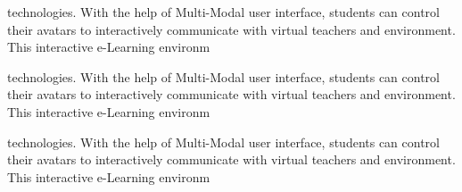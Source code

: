 \documentclass{article}
\begin{document}
technologies. With the help of Multi-Modal user interface, students can control their avatars to interactively communicate with virtual teachers and environment. This interactive e-Learning environm

technologies. With the help of Multi-Modal user interface, students can control their avatars to interactively communicate with virtual teachers and environment. This interactive e-Learning environm

technologies. With the help of Multi-Modal user interface, students can control their avatars to interactively communicate with virtual teachers and environment. This interactive e-Learning environm
\end{document}
